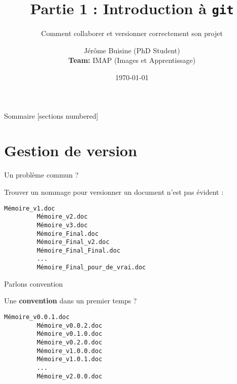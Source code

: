 \documentclass[9pt]{beamer}
\title{Partie 1 : Introduction à \texttt{git}}
\subtitle{Comment collaborer et versionner correctement son projet}
\date{\today}
\author{Jérôme Buisine (PhD Student) \\
\textbf{Team:} IMAP (Images et Apprentissage)}
\begin{document}
	
	\maketitle
	
	\begin{frame}{Sommaire}
		[sections numbered]
		\tableofcontents[hideallsubsections]
	\end{frame}

\section{Gestion de version}
	    
	\begin{frame}[fragile]{Un problème commun ?}
		
        Trouver un nommage pour versionner un document n'est pas évident :

        \vspace{5mm}
        \begin{lstlisting}[style=custombash]
         Mémoire_v1.doc
         Mémoire_v2.doc
         Mémoire_v3.doc
         Mémoire_Final.doc
         Mémoire_Final_v2.doc
         Mémoire_Final_Final.doc
         ...
         Mémoire_Final_pour_de_vrai.doc
        \end{lstlisting}
        
	\end{frame}

    \begin{frame}[fragile]{Parlons convention}
        
        Une \textbf{convention} dans un premier temps ?

        \vspace{5mm}
        \begin{lstlisting}[style=custombash]
         Mémoire_v0.0.1.doc
         Mémoire_v0.0.2.doc
         Mémoire_v0.1.0.doc
         Mémoire_v0.2.0.doc
         Mémoire_v1.0.0.doc
         Mémoire_v1.0.1.doc
         ...
         Mémoire_v2.0.0.doc
        \end{lstlisting}

    \end{frame}
\end{document}
